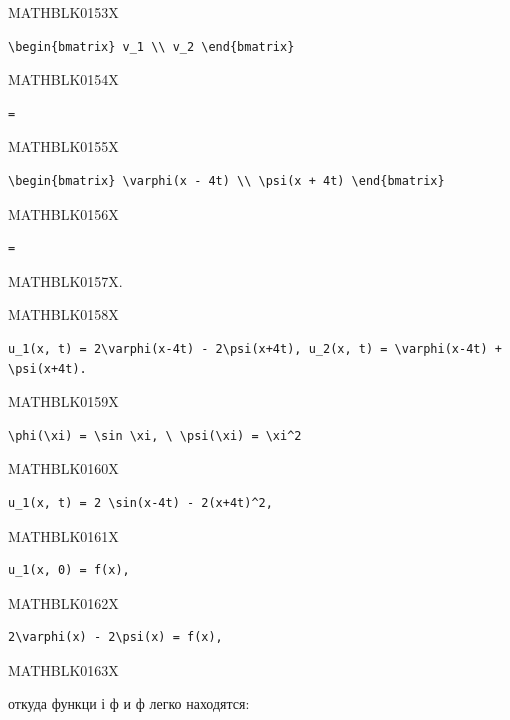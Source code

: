 \documentclass[
  ukrainian,
]{article}
\begin{document}
MATHBLK0153X

\begin{verbatim}
\begin{bmatrix} v_1 \\ v_2 \end{bmatrix}
\end{verbatim}

MATHBLK0154X

\begin{verbatim}
=
\end{verbatim}

MATHBLK0155X

\begin{verbatim}
\begin{bmatrix} \varphi(x - 4t) \\ \psi(x + 4t) \end{bmatrix}
\end{verbatim}

MATHBLK0156X

\begin{verbatim}
=
\end{verbatim}

MATHBLK0157X.

MATHBLK0158X

\begin{verbatim}
u_1(x, t) = 2\varphi(x-4t) - 2\psi(x+4t), u_2(x, t) = \varphi(x-4t) + \psi(x+4t).
\end{verbatim}

MATHBLK0159X

\begin{verbatim}
\phi(\xi) = \sin \xi, \ \psi(\xi) = \xi^2
\end{verbatim}

MATHBLK0160X

\begin{verbatim}
u_1(x, t) = 2 \sin(x-4t) - 2(x+4t)^2,
\end{verbatim}

MATHBLK0161X

\begin{verbatim}
u_1(x, 0) = f(x),
\end{verbatim}

MATHBLK0162X

\begin{verbatim}
2\varphi(x) - 2\psi(x) = f(x),
\end{verbatim}

MATHBLK0163X

откуда функци і ф и ф легко находятся:
\end{document}
